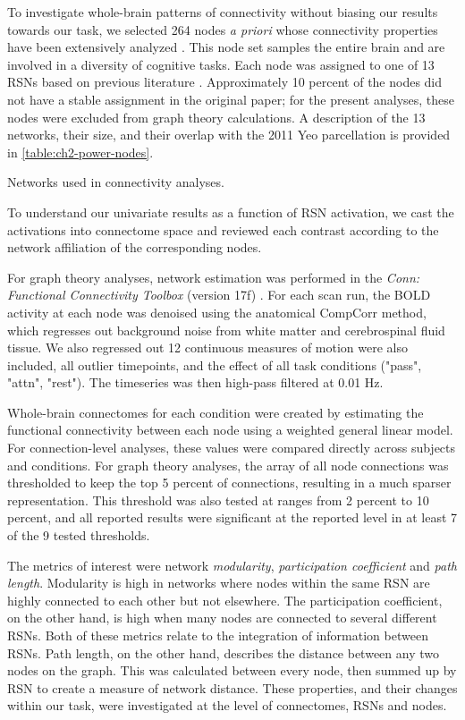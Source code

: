To investigate whole-brain patterns of connectivity without biasing our results towards our task, we selected 264 nodes \textit{a priori} whose connectivity properties have been extensively analyzed \citep{Power2011}. This node set samples the entire brain and are involved in a diversity of cognitive tasks. Each node was assigned to one of 13 RSNs based on previous literature \citep{Power2013}. Approximately 10 percent of the nodes did not have a stable assignment in the original paper; for the present analyses, these nodes were excluded from graph theory calculations. A description of the 13 networks, their size, and their overlap with the 2011 Yeo parcellation is provided in \ref{table:ch2-power-nodes}. 

\begin{table}
	\renewcommand{\tabcolsep}{0.09cm}
	\centering
	
	\caption{Networks used in connectivity analyses.}
	\label{table:ch2-power-nodes}
\end{table}

To understand our univariate results as a function of RSN activation, we cast the activations into connectome space and reviewed each contrast according to the network affiliation of the corresponding nodes.

For graph theory analyses, network estimation was performed in the \textit{Conn: Functional Connectivity Toolbox} (version 17f) \citep{Nieto-castanon}. For each scan run, the BOLD activity at each node was denoised using the anatomical CompCorr method, which regresses out background noise from white matter and cerebrospinal fluid tissue. We also regressed out 12 continuous measures of motion were also included, all outlier timepoints, and the effect of all task conditions ("pass", "attn", "rest"). The timeseries was then high-pass filtered at 0.01 Hz.

Whole-brain connectomes for each condition were created by estimating the functional connectivity between each node using a weighted general linear model. For connection-level analyses, these values were compared directly across subjects and conditions. For graph theory analyses, the array of all node connections was thresholded to keep the top 5 percent of connections, resulting in a much sparser representation. This threshold was also tested at ranges from 2 percent to 10 percent, and all reported results were significant at the reported level in at least 7 of the 9 tested thresholds.

The metrics of interest were network \textit{modularity}, \textit{participation coefficient} and \textit{path length}. Modularity is high in networks where nodes within the same RSN are highly connected to each other but not elsewhere. The participation coefficient, on the other hand, is high when many nodes are connected to several different RSNs. Both of these metrics relate to the integration of information between RSNs. Path length, on the other hand, describes the distance between any two nodes on the graph. This was calculated between every node, then summed up by RSN to create a measure of network distance. These properties, and their changes within our task, were investigated at the level of connectomes, RSNs and nodes. 



